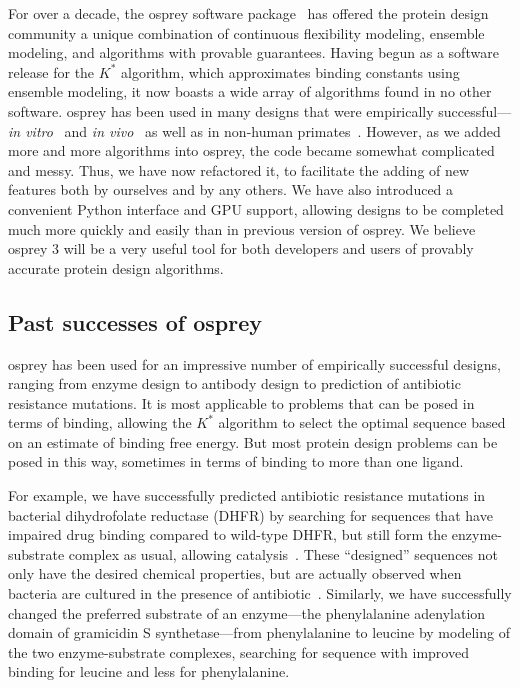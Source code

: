 For over a decade, the {\sc osprey} software package~\cite{OSPREY,minDEE,OSPREY_MIE} has offered the protein design community a unique combination of continuous flexibility modeling, ensemble modeling, and algorithms with provable guarantees.  Having begun as a software release for the $K^*$ algorithm, which approximates binding constants using ensemble modeling, it now boasts a wide array of algorithms found in no other software.  {\sc osprey} has been used in many designs that were empirically successful---\textit{in vitro}~\cite{VRC07_enhance,CFTR,runx1_cbfb,GrsA-LeuA,DHFR-PNAS,GrsA-TyrA,specific_probes} and \textit{in vivo}~\cite{VRC07_enhance,CFTR,runx1_cbfb,DHFR-PNAS} as well as in non-human primates~\cite{VRC07_enhance}.  However, as we added more and more algorithms into {\sc osprey}, the code became somewhat complicated and messy.  Thus, we have now refactored it, to facilitate the adding of new features both by ourselves and by any others.  We have also introduced a convenient Python interface and GPU support, allowing designs to be completed much more quickly and easily than in previous version of {\sc osprey}.  We believe {\sc osprey} 3 will be a very useful tool for both developers and users of provably accurate protein design algorithms.  

\subsection{Past successes of {\sc osprey}}

{\sc osprey} has been used for an impressive number of empirically successful designs, ranging from enzyme design to antibody design to prediction of antibiotic resistance mutations.  It is most applicable to problems that can be posed in terms of binding, allowing the $K^*$ algorithm to select the optimal sequence based on an estimate of binding free energy.  But most protein design problems can be posed in this way, sometimes in terms of binding to more than one ligand.  

For example, we have successfully predicted antibiotic resistance mutations in bacterial dihydrofolate reductase (DHFR) by searching for sequences that have impaired drug binding compared to wild-type DHFR, but still form the enzyme-substrate complex as usual, allowing catalysis~\cite{DHFR-PNAS,DHFR-PNAS2}.  These ``designed'' sequences not only have the desired chemical properties, but are actually observed when bacteria are cultured in the presence of antibiotic~\cite{DHFR-PNAS2}.  Similarly, we have successfully changed the preferred substrate of an enzyme---the phenylalanine adenylation domain of gramicidin S synthetase---from phenylalanine to leucine by modeling of the two enzyme-substrate complexes, searching for sequence with improved binding for leucine and less for phenylalanine.  

